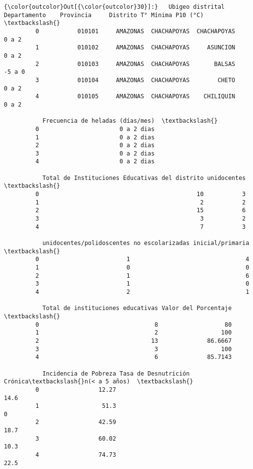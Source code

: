 \documentclass[11pt]{article}
\begin{document}
\begin{Verbatim}[commandchars=\\\{\}]
{\color{outcolor}Out[{\color{outcolor}30}]:}   Ubigeo distrital Departamento    Provincia     Distrito T° Mínima P10 (°C)  \textbackslash{}
         0           010101     AMAZONAS  CHACHAPOYAS  CHACHAPOYAS              0 a 2   
         1           010102     AMAZONAS  CHACHAPOYAS     ASUNCION              0 a 2   
         2           010103     AMAZONAS  CHACHAPOYAS       BALSAS             -5 a 0   
         3           010104     AMAZONAS  CHACHAPOYAS        CHETO              0 a 2   
         4           010105     AMAZONAS  CHACHAPOYAS    CHILIQUIN              0 a 2   
         
           Frecuencia de heladas (días/mes)  \textbackslash{}
         0                       0 a 2 dias   
         1                       0 a 2 dias   
         2                       0 a 2 dias   
         3                       0 a 2 dias   
         4                       0 a 2 dias   
         
           Total de Instituciones Educativas del distrito unidocentes  \textbackslash{}
         0                                             10           3   
         1                                              2           2   
         2                                             15           6   
         3                                              3           2   
         4                                              7           3   
         
           unidocentes/polidoscentes no escolarizadas inicial/primaria  \textbackslash{}
         0                         1                                 4   
         1                         0                                 0   
         2                         1                                 6   
         3                         1                                 0   
         4                         2                                 1   
         
           Total de instituciones educativas Valor del Porcentaje  \textbackslash{}
         0                                 8                   80   
         1                                 2                  100   
         2                                13              86.6667   
         3                                 3                  100   
         4                                 6              85.7143   
         
           Incidencia de Pobreza Tasa de Desnutrición Crónica\textbackslash{}n(< a 5 años)  \textbackslash{}
         0                 12.27                                       14.6   
         1                  51.3                                          0   
         2                 42.59                                       18.7   
         3                 60.02                                       10.3   
         4                 74.73                                       22.5   
         

\end{Verbatim}
\end{document}
